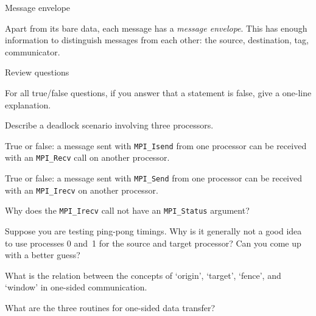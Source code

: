  {Message envelope}
\label{sec:mpi-envelope}

Apart from its bare data, each message has a \emph{message envelope}.
This has enough information to distinguish messages from each other:
the source, destination, tag, communicator.


 {Review questions}

For all true/false questions, if you answer that a statement is false,
give a one-line explanation.

\begin{review}
  Describe a deadlock scenario involving three processors.
\end{review}

\begin{review}
  True or false: a message sent with \lstinline{MPI_Isend} from one processor can be
  received with an \lstinline{MPI_Recv} call on another processor.
\end{review}

\begin{review}
  True or false: a message sent with \lstinline{MPI_Send} from one processor can be
  received with an \lstinline{MPI_Irecv} on another processor.
\end{review}

\begin{review}
  Why does the \lstinline{MPI_Irecv} call not have an \lstinline{MPI_Status} argument?
\end{review}

\begin{review}
  Suppose you are testing ping-pong timings.
  Why is it generally not a good idea to use processes 0 and~1 for the
  source and target processor?  Can you come up with a better guess?
\end{review}

\begin{review}
  What is the relation between the concepts of `origin', `target', `fence',
  and `window' in one-sided communication.
\end{review}

\begin{review}
  What are the three routines for one-sided data transfer?
\end{review}

\lstset{
  style=reviewcode,
  language=C,
}

